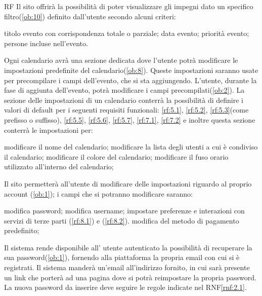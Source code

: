 \begin{listaPersonale}{RF}
	 Il sito offrirà la possibilità di poter visualizzare gli impegni dato un specifico filtro(\ref{ob:10}) definito dall'utente secondo alcuni criteri:
	\begin{listaPersonale2}{}
		 titolo evento con corrispondenza totale o parziale;
		 data evento;
		 priorità evento;
		 persone incluse nell'evento.
	\end{listaPersonale2}

	 Ogni calendario avrà una sezione dedicata dove l'utente potrà modificare le impostazioni predefinite del calendario(\ref{ob:8}). Queste impostazioni saranno usate per precompilare i campi dell'evento, che si sta aggiungendo. L'utente, durante la fase di aggiunta dell'evento, potrà modificare i campi precompilati(\ref{ob:2}). La sezione delle impostazioni di un calendario conterrà la possibilità di definire i valori di default per i seguenti requisiti funzionali: \ref{rf:5.1}, \ref{rf:5.2}, \ref{rf:5.3}(come prefisso o suffisso), \ref{rf:5.5}, \ref{rf:5.6}, \ref{rf:5.7}, \ref{rf:7.1}, \ref{rf:7.2} e inoltre questa sezione conterrà le impostazioni per:
	\begin{listaPersonale2}{}
		 modificare il nome del calendario;
		 modificare la lista degli utenti a cui è condiviso il calendario;
		 modificare il colore del calendario;
		 modificare il fuso orario utilizzato all'interno del calendario;
	\end{listaPersonale2}

	 Il sito permetterà all'utente di modificare delle impostazioni riguardo al proprio account (\ref{ob:1}); i campi che si potranno modificare saranno:
	\begin{listaPersonale2}{}
		 modifica password;
		 modifica username;
		 impostare preferenze e interazioni con servizi di terze parti (\ref{rf:8.1}) e (\ref{rf:8.2}).
		 modifica del metodo di pagamento predefinito;
	\end{listaPersonale2}

	Il sistema rende disponibile all’ utente autenticato la possibilità di recuperare la sua password(\ref{ob:1}), fornendo alla piattaforma la propria email con cui si è registrati. Il sistema manderà un’email all'indirizzo fornito, in cui sarà presente un link che porterà ad una pagina dove si potrà reimpostare la propria password. La nuova password da inserire deve seguire le regole indicate nel RNF\ref{rnf:2.1}. %
\end{listaPersonale}